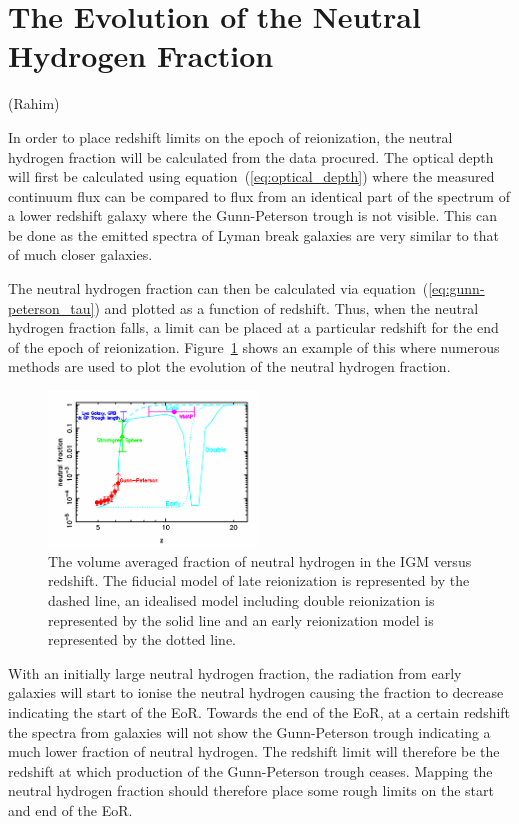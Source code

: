 \section{The Evolution of the Neutral Hydrogen Fraction} %
\label{sec:the_evolution_of_the_neutral_hydrogen_fraction}
(Rahim)

	In order to place redshift limits on the epoch of reionization, the neutral hydrogen fraction will be calculated from the data procured. The optical depth will first be calculated using equation~(\ref{eq:optical_depth}) where the measured continuum flux can be compared to flux from an identical part of the spectrum of a lower redshift galaxy where the Gunn-Peterson trough is not visible. This can be done as the emitted spectra of Lyman break galaxies are very similar to that of much closer galaxies.

	The neutral hydrogen fraction can then be calculated via equation~(\ref{eq:gunn-peterson_tau}) and plotted as a function of redshift. Thus, when the neutral hydrogen fraction falls, a limit can be placed at a particular redshift for the end of the epoch of reionization. Figure~\ref{fig:Evolution_Xh1} shows an example of this where numerous methods are used to plot the evolution of the neutral hydrogen fraction\cite{Fanetal}.
	\begin{figure}[htbp]
		\centering
		\includegraphics[width=0.5\textwidth]{../Images/Evolution_Xh1.png}
		\caption{The volume averaged fraction of neutral hydrogen in the IGM versus redshift. The fiducial model of late reionization is represented by the dashed line, an idealised model including double reionization is represented by the solid line and an early reionization model is represented by the dotted line.}\label{fig:Evolution_Xh1}
	\end{figure}

	With an initially large neutral hydrogen fraction, the radiation from early galaxies will start to ionise the neutral hydrogen causing the fraction to decrease indicating the start of the EoR. Towards the end of the EoR, at a certain redshift the spectra from galaxies will not show the Gunn-Peterson trough indicating a much lower fraction of neutral hydrogen. The redshift limit will therefore be the redshift at which production of the Gunn-Peterson trough ceases. Mapping the neutral hydrogen fraction should therefore place some rough limits on the start and end of the EoR.

